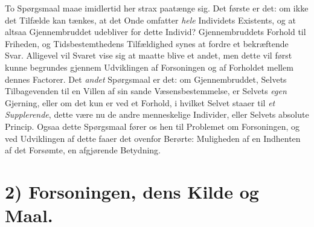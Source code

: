 To Spørgsmaal maae imidlertid her strax paatænge sig. Det første er det: om ikke
det Tilfælde kan tænkes, at det Onde omfatter \emph{hele} Individets Existents,
og at altsaa Gjennembruddet udebliver for dette Individ? Gjennembruddets Forhold
til Friheden, og Tidsbestemthedens Tilfældighed synes at fordre et bekræftende
Svar. Alligevel vil Svaret vise sig at maatte blive et andet, men dette vil først
kunne begrundes gjennem Udviklingen af Forsoningen og af Forholdet mellem dennes
Factorer. Det \emph{andet} Spørgsmaal er det: om Gjennembruddet, Selvets
Tilbagevenden til en Villen af sin sande Væsensbestemmelse, er Selvets
\emph{egen} Gjerning, eller om det kun er ved et Forhold, i hvilket Selvet staaer
til \emph{et Supplerende}, dette være nu de andre menneskelige Individer, eller
Selvets absolute Princip. Ogsaa dette Spørgsmaal fører os hen til Problemet om
Forsoningen, og ved Udviklingen af dette faaer det ovenfor Berørte: Muligheden af
en Indhenten af det Forsømte, en afgjørende Betydning.

\section*{2) Forsoningen, dens Kilde og Maal.}

